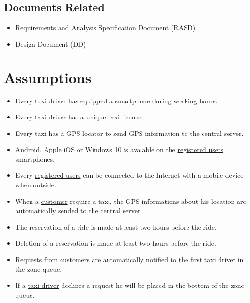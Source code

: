 \documentclass{report}
\begin{document}
		\subsection{Documents Related}

			\begin{itemize}
				\item Requirements and Analysis Specification Document (RASD)

				\item Design Document (DD)
			\end{itemize}

	\section{Assumptions}

			\begin{itemize}
				\item Every \hyperref[sec:tdriver]{taxi driver} has equipped a smartphone during working hours.

				\item Every \hyperref[sec:tdriver]{taxi driver} has a unique taxi license.

				\item Every taxi has a GPS locator to send GPS information to the central server.

				\item Android, Apple iOS or Windows 10 is avaiable on the \hyperref[sec:ruser]{registered users} smartphones.

				\item Every \hyperref[sec:ruser]{registered users} can be connected to the Internet with a mobile device when outside.

				\item When a \hyperref[sec:customer]{customer} require a taxi, the GPS informations about his location are automatically sended to the central server.

				\item The reservation of a ride is made at least two hours before the ride.

				\item Deletion of a reservation is made at least two hours before the ride.

				\item Requests from \hyperref[sec:customer]{customers} are automatically notified to the first \hyperref[sec:tdriver]{taxi driver} in the zone queue.

				\item If a \hyperref[sec:tdriver]{taxi driver} declines a request he will be placed in the bottom of the zone queue.


\end{itemize}
\end{document}
